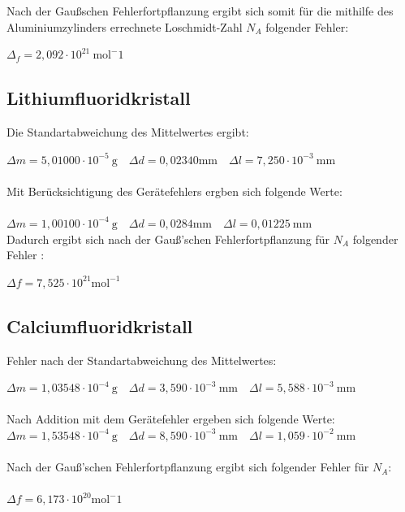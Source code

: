 \documentclass[12pt,a4paper,titlepage,headinclude,bibtotoc]{scrartcl}
\begin{document}
Nach der Gaußschen Fehlerfortpflanzung ergibt sich somit für die mithilfe des Aluminiumzylinders errechnete Loschmidt-Zahl $N_A$ folgender Fehler:\\

\vspace{3mm}

$\Delta_f = 2,092\cdot10^{21}\ \mathrm{mol^-1}$


\subsection{Lithiumfluoridkristall}

Die Standartabweichung des Mittelwertes ergibt:\\

\vspace{3mm}

$\Delta m = 5,01000\cdot10^{-5} \ \mathrm{g} \quad \Delta d= 0,02340  \mathrm{mm} \quad \Delta l = 7,250 \cdot 10^{-3}\ \mathrm{mm}$\\
\\
Mit Berücksichtigung des Gerätefehlers ergben sich folgende Werte:\\
\\
$\Delta m = 1,00100\cdot10^{-4} \ \mathrm{g} \quad \Delta d= 0,0284 \mathrm{mm} \quad \Delta l = 0,01225 \ \mathrm{mm}$\\

Dadurch ergibt sich nach der Gauß'schen Fehlerfortpflanzung für $N_A$ folgender Fehler :\\

\vspace{3mm}

$\Delta f= 7,525 \cdot 10^{21} \mathrm{mol^{-1}}$

\newpage

\subsection{Calciumfluoridkristall}

Fehler nach der Standartabweichung des Mittelwertes: 
\vspace{3mm}

$\Delta m = 1,03548\cdot10^{-4} \ \mathrm{g} \quad \Delta d= 3,590 \cdot 10^{-3} \ \mathrm{mm} \quad \Delta l = 5,588 \cdot 10^{-3}\ \mathrm{mm}$\\
\\
Nach Addition mit dem Gerätefehler ergeben sich folgende Werte:
\\
$\Delta m = 1,53548\cdot10^{-4} \ \mathrm{g} \quad \Delta d= 8,590 \cdot 10^{-3} \ \mathrm{mm} \quad \Delta l = 1,059 \cdot 10^{-2}\ \mathrm{mm}$\\
\\
Nach der Gauß'schen Fehlerfortpflanzung ergibt sich folgender Fehler für $N_A$:\\
\\
$\Delta f =6,173 \cdot 10^{20} \mathrm{mol^-1}$
\end{document}
